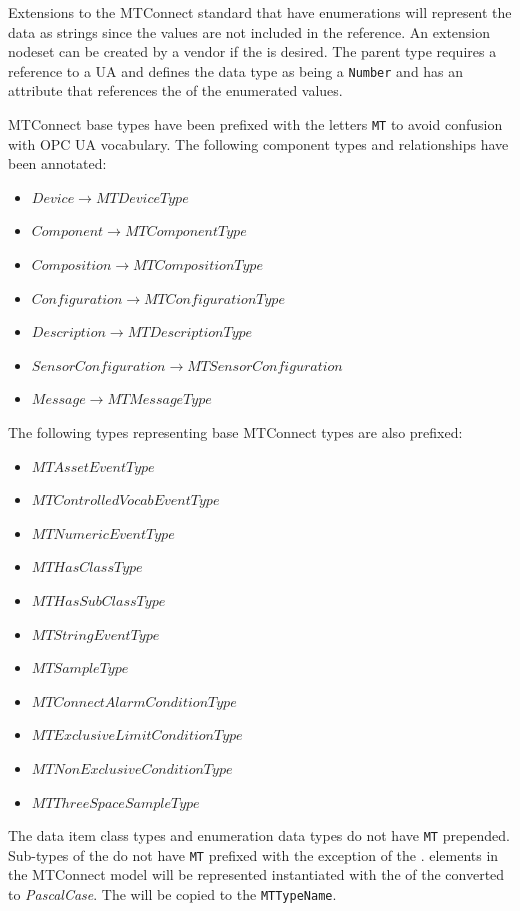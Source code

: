 Extensions to the MTConnect standard that have enumerations will represent the data as strings since the values are not included in the  reference. An extension nodeset can be created by a vendor if the  is desired. The parent type requires a reference to a UA  and defines the data type as being a \texttt{Number} and has an attribute that references the  of the enumerated values.

MTConnect base types have been prefixed with the letters \texttt{MT} to avoid confusion with OPC UA vocabulary. The following component types and relationships have been annotated:

\begin{itemize}
\item $Device \rightarrow MTDeviceType$
\item $Component \rightarrow MTComponentType$
\item $Composition \rightarrow MTCompositionType$
\item $Configuration \rightarrow MTConfigurationType$
\item $Description \rightarrow MTDescriptionType$
\item $SensorConfiguration \rightarrow MTSensorConfiguration$
\item $Message \rightarrow MTMessageType$
\end{itemize}

The following types representing base MTConnect types are also prefixed:

\begin{itemize}
\item $MTAssetEventType$
\item $MTControlledVocabEventType$
\item $MTNumericEventType$
\item $MTHasClassType$
\item $MTHasSubClassType$
\item $MTStringEventType$
\item $MTSampleType$
\item $MTConnectAlarmConditionType$
\item $MTExclusiveLimitConditionType$
\item $MTNonExclusiveConditionType$
\item $MTThreeSpaceSampleType$
\end{itemize}

The data item class types and enumeration data types do not have \texttt{MT} prepended. Sub-types of the  do not have \texttt{MT} prefixed with the exception of the .  elements in the MTConnect model will be represented instantiated with the  of the   converted to \textit{PascalCase}. The  will be copied to the  \texttt{MTTypeName}.

